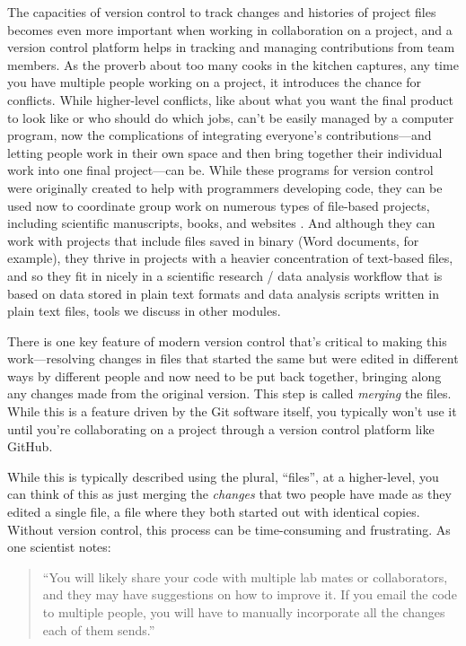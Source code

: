 \documentclass[]{tufte-book}
\begin{document}
The capacities of version control to track changes and histories of project
files becomes even more important when working in collaboration on a project,
and a version control platform helps in tracking and managing contributions from
team members. As the proverb about too many cooks in the kitchen captures, any
time you have multiple people working on a project, it introduces the chance for
conflicts. While higher-level conflicts, like about what you want the final
product to look like or who should do which jobs, can't be easily managed by a
computer program, now the complications of integrating everyone's
contributions---and letting people work in their own space and then bring
together their individual work into one final project---can be. While these
programs for version control were originally created to help with programmers
developing code, they can be used now to coordinate group work on numerous types
of file-based projects, including scientific manuscripts, books, and websites
\citep{raymondunderstanding}. And although they can work with projects that include
files saved in binary (Word documents, for example), they thrive in projects
with a heavier concentration of text-based files, and so they fit in nicely in a
scientific research / data analysis workflow that is based on data stored in
plain text formats and data analysis scripts written in plain text files, tools
we discuss in other modules.

There is one key feature of modern version control that's critical to making
this work---resolving changes in files that started the same but were edited in
different ways by different people and now need to be put back together,
bringing along any changes made from the original version. This step is called
\emph{merging} the files. While this is a feature driven by the Git software itself,
you typically won't use it until you're collaborating on a project through
a version control platform like GitHub.

While this is typically described using the plural, ``files'', at a higher-level,
you can think of this as just merging the \emph{changes} that two people have made as
they edited a single file, a file where they both started out with identical
copies. Without version control, this process can be time-consuming and
frustrating. As one scientist notes:

\begin{quote}
``You will likely share your code with multiple lab mates or collaborators,
and they may have suggestions on how to improve it. If you email the code
to multiple people, you will have to manually incorporate all the changes
each of them sends.'' \citep{blischak2016quick}
\end{quote}
\end{document}
